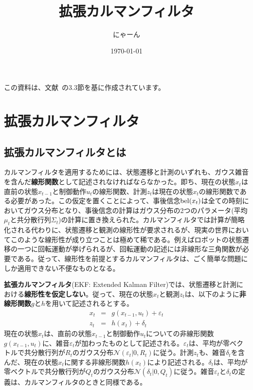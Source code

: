 \documentclass[dvipdfmx,a4paper]{jsarticle}
\title{拡張カルマンフィルタ}
\author{にゃーん}
\date{\today}
\begin{document}
\maketitle

この資料は、文献~\cite{Thrun07}の3.3節を基に作成されています。

\section{拡張カルマンフィルタ}
\subsection{拡張カルマンフィルタとは}
カルマンフィルタを適用するためには、状態遷移と計測のいずれも、ガウス雑音を含んだ\textbf{線形関数}として記述されなければならなかった。即ち、現在の状態$x_t$は直前の状態$x_{t - 1}$と制御動作$u_t$の線形関数、計測$z_t$は現在の状態$x_t$の線形関数である必要があった。この仮定を置くことによって、事後信念$\operatorname{bel}(x_t)$は全ての時刻においてガウス分布となり、事後信念の計算はガウス分布の2つのパラメータ(平均$\mu_t$と共分散行列$\Sigma_t$)の計算に置き換えられた。カルマンフィルタでは計算が簡略化される代わりに、状態遷移と観測の線形性が要求されるが、現実の世界においてこのような線形性が成り立つことは極めて稀である。例えばロボットの状態遷移の一つに回転運動が挙げられるが、回転運動の記述には非線形な三角関数が必要である。従って、線形性を前提とするカルマンフィルタは、ごく簡単な問題にしか適用できない不便なものとなる。\newline

\textbf{拡張カルマンフィルタ}(EKF: Extended Kalman Filter)では、状態遷移と計測における\textbf{線形性を仮定しない}。従って、現在の状態$x_t$と観測$z_t$は、以下のように\textbf{非線形関数}$g$と$h$を用いて記述されるとする。
\begin{eqnarray}
	x_t &=& g(x_{t - 1}, u_t) + \varepsilon_t \\
	z_t &=& h(x_t) + \delta_t
\end{eqnarray}
現在の状態$x_t$は、直前の状態$x_{t - 1}$と制御動作$u_t$についての非線形関数$g(x_{t - 1}, u_t)$に、雑音$\varepsilon_t$が加わったものとして記述される。$\varepsilon_t$は、平均が零ベクトルで共分散行列が$R_t$のガウス分布$\mathcal{N}(\varepsilon_t | 0, R_t)$に従う。計測$z_t$も、雑音$\delta_t$を含んだ、現在の状態$x_t$に関する非線形関数$h(x_t)$により記述される。$\delta_t$は、平均が零ベクトルで共分散行列が$Q_t$のガウス分布$\mathcal{N}(\delta_t | 0, Q_t)$に従う。雑音$\varepsilon_t$と$\delta_t$の定義は、カルマンフィルタのときと同様である。\newline
\end{document}
